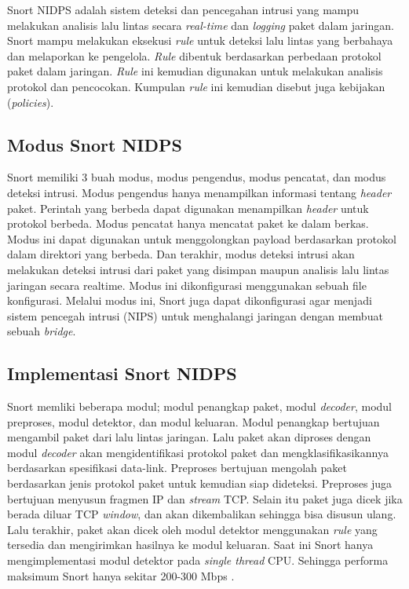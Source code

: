    Snort NIDPS adalah sistem deteksi dan pencegahan intrusi yang mampu melakukan analisis lalu lintas secara \emph{real-time} dan \emph{logging} paket dalam jaringan. Snort mampu melakukan eksekusi \emph{rule} untuk deteksi lalu lintas yang berbahaya dan melaporkan ke pengelola. \emph{Rule} dibentuk berdasarkan perbedaan protokol paket dalam jaringan. \emph{Rule} ini kemudian digunakan untuk melakukan analisis protokol dan pencocokan. Kumpulan \emph{rule} ini kemudian disebut juga kebijakan (\emph{policies}). 

  \subsection{Modus Snort NIDPS}

    Snort memiliki 3 buah modus, modus pengendus, modus pencatat, dan modus deteksi intrusi. Modus pengendus hanya menampilkan informasi tentang \emph{header} paket. Perintah yang berbeda dapat digunakan menampilkan \emph{header} untuk protokol berbeda. Modus pencatat hanya mencatat paket ke dalam berkas. Modus ini dapat digunakan untuk menggolongkan payload berdasarkan protokol dalam direktori yang berbeda. Dan terakhir, modus deteksi intrusi akan melakukan deteksi intrusi dari paket yang disimpan maupun analisis lalu lintas jaringan secara realtime. Modus ini dikonfigurasi menggunakan sebuah file konfigurasi. Melalui modus ini, Snort juga dapat dikonfigurasi agar menjadi sistem pencegah intrusi (NIPS) untuk menghalangi jaringan dengan membuat sebuah \emph{bridge}.

  \subsection{Implementasi Snort NIDPS}

    Snort memliki beberapa modul; modul penangkap paket, modul \emph{decoder}, modul preproses, modul detektor, dan modul keluaran. Modul penangkap bertujuan mengambil paket dari lalu lintas jaringan. Lalu paket akan diproses dengan modul \emph{decoder} akan mengidentifikasi protokol paket dan mengklasifikasikannya berdasarkan spesifikasi data-link. Preproses bertujuan mengolah paket berdasarkan jenis protokol paket untuk kemudian siap dideteksi. Preproses juga bertujuan menyusun fragmen IP dan \emph{stream} TCP. Selain itu paket juga dicek jika berada diluar TCP \emph{window}, dan akan dikembalikan sehingga bisa disusun ulang. Lalu terakhir, paket akan dicek oleh modul detektor menggunakan \emph{rule} yang tersedia dan mengirimkan hasilnya ke modul keluaran. Saat ini Snort hanya mengimplementasi modul detektor pada \emph{single thread} CPU. Sehingga performa maksimum Snort hanya sekitar 200-300 Mbps \citep{albin2012}.


